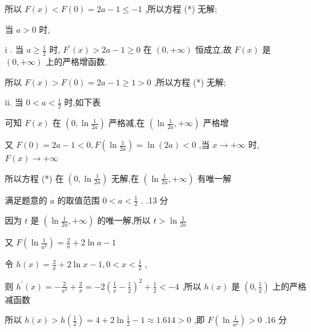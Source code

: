 \documentclass[10pt]{article}
\begin{document}
所以 \(F\left( x\right)  < F\left( 0\right)  = {2a} - 1 \leq   - 1\) ,所以方程 (*) 无解;

当 \(a > 0\) 时,

\(\mathrm{i}\) . 当 \(a \geq  \frac{1}{2}\) 时, \({F}^{\prime }\left( x\right)  > {2a} - 1 \geq  0\) 在 \(\left( {0, + \infty }\right)\) 恒成立,故 \(F\left( x\right)\) 是 \(\left( {0, + \infty }\right)\) 上的严格增函数.

所以 \(F\left( x\right)  > F\left( 0\right)  = {2a} - 1 \geq  1 > 0\) ,所以方程 (*) 无解;

ii. 当 \(0 < a < \frac{1}{2}\) 时,如下表

\begin{center}
\end{center}

可知 \(F\left( x\right)\) 在 \(\left( {0,\ln \frac{1}{2a}}\right)\) 严格减,在 \(\left( {\ln \frac{1}{2a}, + \infty }\right)\) 严格增

又 \(F\left( 0\right)  = {2a} - 1 < 0,F\left( {\ln \frac{1}{2a}}\right)  = \ln \left( {2a}\right)  < 0\) ,当 \(x \rightarrow   + \infty\) 时, \(F\left( x\right)  \rightarrow   + \infty\)

所以方程 (*) 在 \(\left( {0,\ln \frac{1}{2a}}\right)\) 无解,在 \(\left( {\ln \frac{1}{2a}, + \infty }\right)\) 有唯一解

满足题意的 \(a\) 的取值范围 \(0 < a < \frac{1}{2}\) . .13 分

因为 \(t\) 是 \(\left( {\ln \frac{1}{2a}, + \infty }\right)\) 的唯一解,所以 \(t > \ln \frac{1}{2a}\)

又 \(F\left( {\ln \frac{1}{{a}^{2}}}\right)  = \frac{2}{a} + 2\ln a - 1\)

令 \(h\left( x\right)  = \frac{2}{x} + 2\ln x - 1,0 < x < \frac{1}{2}\) ,

则 \({h}^{\prime }\left( x\right)  =  - \frac{2}{{x}^{2}} + \frac{2}{x} =  - 2{\left( \frac{1}{x} - \frac{1}{2}\right) }^{2} + \frac{1}{2} <  - 4\) ,所以 \(h\left( x\right)\) 是 \(\left( {0,\frac{1}{2}}\right)\) 上的严格减函数

所以 \(h\left( x\right)  > h\left( \frac{1}{2}\right)  = 4 + 2\ln \frac{1}{2} - 1 \approx  {1.614} > 0\) ,即 \(F\left( {\ln \frac{1}{{a}^{2}}}\right)  > 0\) .16 分
\end{document}
